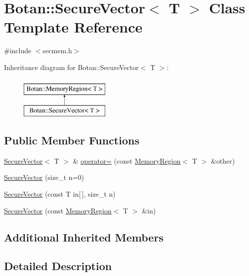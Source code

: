 \hypertarget{classBotan_1_1SecureVector}{\section{Botan\-:\-:Secure\-Vector$<$ T $>$ Class Template Reference}
\label{classBotan_1_1SecureVector}
}


{\ttfamily \#include $<$secmem.\-h$>$}

Inheritance diagram for Botan\-:\-:Secure\-Vector$<$ T $>$\-:\begin{figure}[H]
\begin{center}
\leavevmode
\includegraphics[height=2.000000cm]{classBotan_1_1SecureVector}
\end{center}
\end{figure}
\subsection*{Public Member Functions}
\begin{DoxyCompactItemize}
\item 
\hyperlink{classBotan_1_1SecureVector}{Secure\-Vector}$<$ T $>$ \& \hyperlink{classBotan_1_1SecureVector_abdbf30bf25c67756ee898e3da669d0f8}{operator=} (const \hyperlink{classBotan_1_1MemoryRegion}{Memory\-Region}$<$ T $>$ \&other)
\item 
\hyperlink{classBotan_1_1SecureVector_a21b78f1a5df8bb98f0f719b96f64cfe4}{Secure\-Vector} (size\-\_\-t n=0)
\item 
\hyperlink{classBotan_1_1SecureVector_ac611e350a1e25f3117df75b6082e0b1a}{Secure\-Vector} (const T in\mbox{[}$\,$\mbox{]}, size\-\_\-t n)
\item 
\hyperlink{classBotan_1_1SecureVector_a3b3ff56b8a8165e4744e20d536f73f60}{Secure\-Vector} (const \hyperlink{classBotan_1_1MemoryRegion}{Memory\-Region}$<$ T $>$ \&in)
\end{DoxyCompactItemize}
\subsection*{Additional Inherited Members}


\subsection{Detailed Description}

